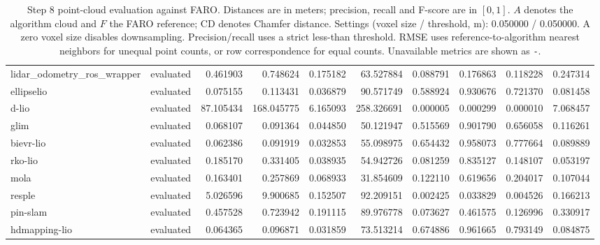 \documentclass{article}
\begin{document}
\begin{table}[htbp]
\begin{tabular}{llrrrrrrrr}
lidar\_odometry\_ros\_wrapper & evaluated & 0.461903 & 0.748624 & 0.175182 & 63.527884 & 0.088791 & 0.176863 & 0.118228 & 0.247314 \\
ellipselio & evaluated & 0.075155 & 0.113431 & 0.036879 & 90.571749 & 0.588924 & 0.930676 & 0.721370 & 0.081458 \\
d-lio & evaluated & 87.105434 & 168.045775 & 6.165093 & 258.326691 & 0.000005 & 0.000299 & 0.000010 & 7.068457 \\
glim & evaluated & 0.068107 & 0.091364 & 0.044850 & 50.121947 & 0.515569 & 0.901790 & 0.656058 & 0.116261 \\
bievr-lio & evaluated & 0.062386 & 0.091919 & 0.032853 & 55.098975 & 0.654432 & 0.958073 & 0.777664 & 0.089889 \\
rko-lio & evaluated & 0.185170 & 0.331405 & 0.038935 & 54.942726 & 0.081259 & 0.835127 & 0.148107 & 0.053197 \\
mola & evaluated & 0.163401 & 0.257869 & 0.068933 & 31.854609 & 0.122110 & 0.619656 & 0.204017 & 0.107044 \\
resple & evaluated & 5.026596 & 9.900685 & 0.152507 & 92.209151 & 0.002425 & 0.033829 & 0.004526 & 0.166213 \\
pin-slam & evaluated & 0.457528 & 0.723942 & 0.191115 & 89.976778 & 0.073627 & 0.461575 & 0.126996 & 0.330917 \\
hdmapping-lio & evaluated & 0.064365 & 0.096871 & 0.031859 & 73.513214 & 0.674886 & 0.961665 & 0.793149 & 0.084875 \\
\hline
\end{tabular}
\caption{Step 8 point-cloud evaluation against FARO. Distances are in meters; precision, recall and F-score are in $[0,1]$. $A$ denotes the algorithm cloud and $F$ the FARO reference; CD denotes Chamfer distance. Settings (voxel size / threshold, m): 0.050000 / 0.050000. A zero voxel size disables downsampling. Precision/recall uses a strict less-than threshold. RMSE uses reference-to-algorithm nearest neighbors for unequal point counts, or row correspondence for equal counts. Unavailable metrics are shown as \texttt{-}.}
\label{tab:step8-point-cloud-evaluation}
\end{table}

\vspace*{\fill}
\end{document}

